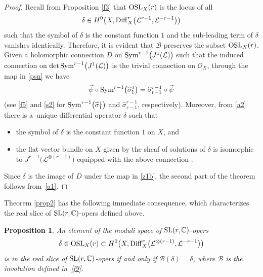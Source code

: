 \documentclass[10pt,a4paper]{amsart}
\numberwithin{equation}{section}
\newtheorem{Proposition}[Theorem]{Proposition}
 { \theoremstyle{definition}
\newtheorem{Definition}[Theorem]{Definition}
\newtheorem{Note}[Theorem]{Note}
\newtheorem{Example}[Theorem]{Example}
\newtheorem{Remark}[Theorem]{Remark} }
\begin{document}
\begin{proof}
Recall from Proposition \ref{f3} that ${\rm OSL}_X(r)$ is the locus of all
\[
\delta \in H^0\bigl(X, {\rm
Diff}^r_X\bigl({\mathcal L}^{r-1}, {\mathcal L}^{-r-1}\bigr)\bigr)\]
 such that the symbol of $\delta$ is
the constant function $1$ and the sub-leading term of $\delta$ vanishes identically.
Therefore, it is evident that $\mathcal B$ preserves the subset ${\rm OSL}_X(r)$.
Given a holomorphic connection $D$ on
${\rm Sym}^{r-1}\bigl(J^1(\mathcal L)\bigr)$ such that the induced connection on $\det {\rm
Sym}^{r-1}\bigl(J^1(\mathcal L)\bigr)$ is the trivial connection on ${\mathcal O}_X$,
through the map \smash{$\widetilde{\psi}$} in \eqref{psn} we have
\begin{equation}\label{a1}
\widetilde{\psi}\circ{\rm Sym}^{r-1}\bigl(\widehat{\sigma}^1_1\bigr) = \widehat{\sigma}^{r-1}_{r-1}
\circ\widetilde{\psi}
\end{equation}
(see \eqref{f5} and \eqref{s2} for ${\rm Sym}^{r-1}\bigl(\widehat{\sigma}^1_1\bigr)$ and
$\widehat{\sigma}^{r-1}_{r-1}$, respectively). Moreover, from \eqref{a2}
there is a~unique differential operator $\delta$ such that
\begin{itemize}\itemsep=0pt
\item the symbol of $\delta$ is the constant function $1$ on $X$, and

\item the flat vector bundle on $X$ given by the sheaf of solutions of $\delta$ is isomorphic to
$J^{r-1}\!\bigl(\!{\mathcal L}^{\otimes (\!r-1\!)}\bigr)$ equipped with the above connection .
\end{itemize}
Since $\delta$ is the image of $D$ under the map in \eqref{z1b}, the second
part of the theorem follows from~\eqref{a1}.
\end{proof}

Theorem \ref{prop2} has the following immediate consequence, which characterizes the real slice of ${\rm SL}(r,\mathbb{C})$-opers defined above.

\begin{Proposition}\label{corpr2}
An element of the moduli space of ${\rm SL}(r,\mathbb{C})$-opers
\[
\delta \in {\rm OSL}_X(r) \subset H^0\bigl(X,
{\rm Diff}^r_X\bigl({\mathcal L}^{\otimes (r-1)}, {\mathcal L}^{-r-1}\bigr)\bigr)
\]
is in the real slice of ${\rm SL}(r,{\mathbb C})$-opers if and only if
${\mathcal B}(\delta) = \delta$, where $\mathcal B$ is the involution defined in~\eqref{f9}.
\end{Proposition}
\end{document}
